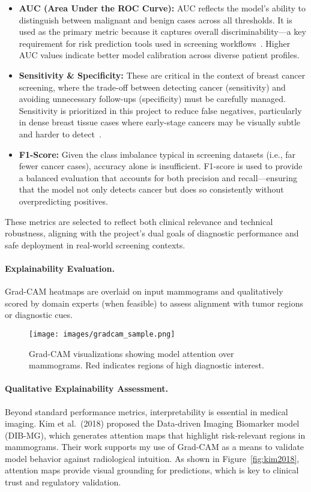 \documentclass[12pt]{article}
\begin{document}
\begin{itemize}
    \item \textbf{AUC (Area Under the ROC Curve):} AUC reflects the model’s ability to distinguish between malignant and benign cases across all thresholds. It is used as the primary metric because it captures overall discriminability—a key requirement for risk prediction tools used in screening workflows~\cite{1}. Higher AUC values indicate better model calibration across diverse patient profiles.

    \item \textbf{Sensitivity \& Specificity:} These are critical in the context of breast cancer screening, where the trade-off between detecting cancer (sensitivity) and avoiding unnecessary follow-ups (specificity) must be carefully managed. Sensitivity is prioritized in this project to reduce false negatives, particularly in dense breast tissue cases where early-stage cancers may be visually subtle and harder to detect~\cite{6}.

    \item \textbf{F1-Score:} Given the class imbalance typical in screening datasets (i.e., far fewer cancer cases), accuracy alone is insufficient. F1-score is used to provide a balanced evaluation that accounts for both precision and recall—ensuring that the model not only detects cancer but does so consistently without overpredicting positives.
\end{itemize}

These metrics are selected to reflect both clinical relevance and technical robustness, aligning with the project’s dual goals of diagnostic performance and safe deployment in real-world screening contexts.

\paragraph{Explainability Evaluation.}
Grad-CAM heatmaps are overlaid on input mammograms and qualitatively scored by domain experts (when feasible) to assess alignment with tumor regions or diagnostic cues.

\begin{figure}[H]
    \centering
    \texttt{[image: images/gradcam\_sample.png]}
    \caption{Grad-CAM visualizations showing model attention over mammograms. Red indicates regions of high diagnostic interest.}
\end{figure}

\paragraph{Qualitative Explainability Assessment.}
Beyond standard performance metrics, interpretability is essential in medical imaging. Kim et al.\ (2018) proposed the Data-driven Imaging Biomarker model (DIB-MG), which generates attention maps that highlight risk-relevant regions in mammograms. Their work supports my use of Grad-CAM as a means to validate model behavior against radiological intuition. As shown in Figure~\ref{fig:kim2018}, attention maps provide visual grounding for predictions, which is key to clinical trust and regulatory validation.
\end{document}
